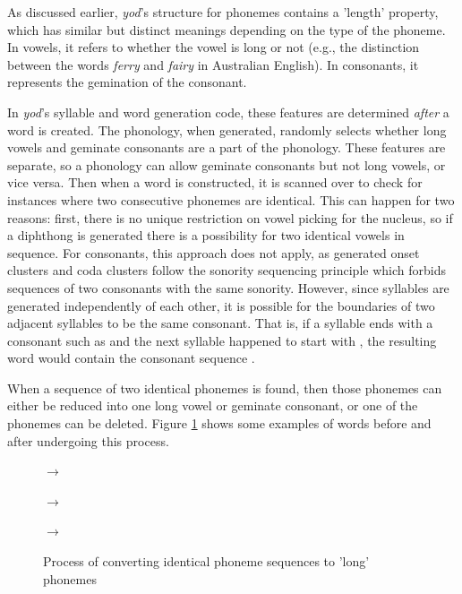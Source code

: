 \documentclass{report}
\begin{document}
	As discussed earlier, \textit{yod}'s structure for phonemes contains a 'length' property, which has similar but distinct meanings depending on the type of the phoneme. In vowels, it refers to whether the vowel is long or not (e.g., the distinction between the words \textit{ferry}  and \textit{fairy}  in Australian English). In consonants, it represents the gemination of the consonant.
	
	In \textit{yod}'s syllable and word generation code, these features are determined \textit{after} a word is created. The phonology, when generated, randomly selects whether long vowels and geminate consonants are a part of the phonology. These features are separate, so a phonology can allow geminate consonants but not long vowels, or vice versa. Then when a word is constructed, it is scanned over to check for instances where two consecutive phonemes are identical. This can happen for two reasons: first, there is no unique restriction on vowel picking for the nucleus, so if a diphthong is generated there is a possibility for two identical vowels in sequence. For consonants, this approach does not apply, as generated onset clusters and coda clusters follow the sonority sequencing principle which forbids sequences of two consonants with the same sonority. However, since syllables are generated independently of each other, it is possible for the boundaries of two adjacent syllables to be the same consonant. That is, if a syllable ends with a consonant such as  and the next syllable happened to start with , the resulting word would contain the consonant sequence .
	
	When a sequence of two identical phonemes is found, then those phonemes can either be reduced into one long vowel or geminate consonant, or one of the phonemes can be deleted. Figure \ref{convert to long phonemes examples} shows some examples of words before and after undergoing this process.
	
	\begin{figure}[h]
		\caption{Process of converting identical phoneme sequences to 'long' phonemes}
		\label{convert to long phonemes examples}
		\begin{tcolorbox}
			\begin{Large}
				 $\rightarrow$ 
				
				 $\rightarrow$ 
				
				 $\rightarrow$ 
			\end{Large}
		\end{tcolorbox}
	\end{figure}
\end{document}
